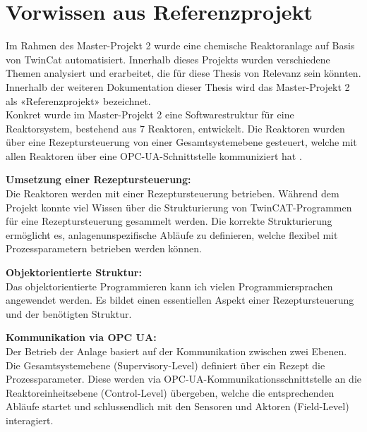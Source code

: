 \section{Vorwissen aus Referenzprojekt} \label{Vorwissen aus Vorprojekt}
	Im Rahmen des Master-Projekt 2 wurde eine chemische Reaktoranlage auf Basis von TwinCat automatisiert. Innerhalb dieses Projekts wurden verschiedene Themen analysiert und erarbeitet, die für diese Thesis von Relevanz sein könnten. Innerhalb der weiteren Dokumentation dieser Thesis wird das Master-Projekt 2 als «Referenzprojekt» bezeichnet. 
	\\
	Konkret wurde im Master-Projekt 2 eine Softwarestruktur für eine Reaktorsystem, bestehend aus 7 Reaktoren, entwickelt. Die Reaktoren wurden über eine Rezeptursteuerung von einer Gesamtsystemebene gesteuert, welche mit allen Reaktoren über eine OPC-UA-Schnittstelle kommuniziert hat \cite{Referenzprojekt}. 
	\vspace{3mm}
	
	\textbf{Umsetzung einer Rezeptursteuerung:} \vspace{2mm} 
	\\
	Die Reaktoren werden mit einer Rezeptursteuerung betrieben. Während dem Projekt konnte viel Wissen über die Strukturierung von TwinCAT-Programmen für eine Rezeptursteuerung gesammelt werden. Die korrekte Strukturierung ermöglicht es, anlagenunspezifische Abläufe zu definieren, welche flexibel mit Prozessparametern betrieben werden können. 
	\vspace{3mm}
	
	\textbf{Objektorientierte Struktur:} \vspace{2mm} 
	\\
	Das objektorientierte Programmieren kann ich vielen Programmiersprachen angewendet werden. Es bildet einen essentiellen Aspekt einer Rezeptursteuerung und der benötigten Struktur.
	\vspace{3mm}
	
	\textbf{Kommunikation via OPC UA:} \vspace{2mm} 
	\\
	Der Betrieb der Anlage basiert auf der Kommunikation zwischen zwei Ebenen. Die Gesamtsystemebene (Supervisory-Level) definiert über ein Rezept die Prozessparameter. Diese werden via OPC-UA-Kommunikationsschnittstelle an die Reaktoreinheitsebene (Control-Level) übergeben, welche die entsprechenden Abläufe startet und schlussendlich mit den Sensoren und Aktoren (Field-Level) interagiert. 
	\vspace{3mm}
	
